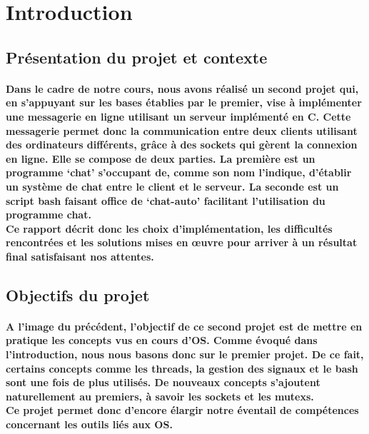 \documentclass[utf8]{article}
\begin{document}
\newpage
\tableofcontents

\newpage



\section{Introduction}
\subsection{Présentation du projet et contexte}
\paragraph{Dans le cadre de notre cours, nous avons réalisé un second projet qui, en s'appuyant sur les bases établies par le premier, vise à implémenter une messagerie en ligne utilisant un serveur implémenté en C.
Cette messagerie permet donc la communication entre deux clients utilisant des ordinateurs différents, grâce à des sockets qui gèrent la connexion en ligne. 
Elle se compose de deux parties. La première est un programme `chat' s'occupant de, comme son nom l'indique, d'établir un système de chat entre le client et le serveur. La seconde 
est un script bash faisant office de `chat-auto' facilitant l'utilisation du programme chat. \\
Ce rapport décrit donc les choix d'implémentation, les difficultés rencontrées et les solutions mises en œuvre pour arriver à un résultat final satisfaisant nos attentes.}

\subsection{Objectifs du projet}
\paragraph{A l'image du précédent, l'objectif de ce second projet est de mettre en pratique les concepts vus en cours d'OS. Comme évoqué dans l'introduction, nous nous basons donc
sur le premier projet. De ce fait, certains concepts comme les threads, la gestion des signaux et le bash sont une fois de plus utilisés. De nouveaux concepts s'ajoutent naturellement 
au premiers, à savoir les sockets et les mutexs. \\
Ce projet permet donc d'encore élargir notre éventail de compétences concernant les outils liés aux OS.}
\end{document}
